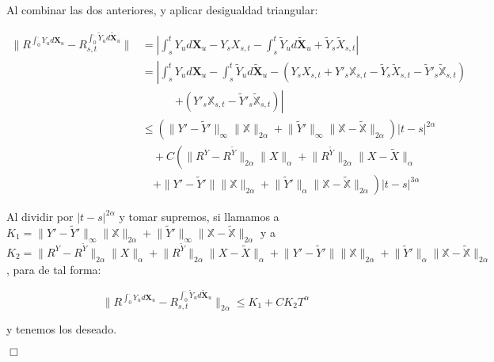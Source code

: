 Al combinar las dos anteriores, y aplicar desigualdad triangular:

\begin{align*}	
	\lVert R^{ \int_0^{\cdot} Y_u d \mathbf{X}_u} - R^{\int_0^{\cdot} \tilde{Y}_u d \tilde{ \mathbf{X} }_u }_{s,t}  \rVert &= \left\lvert \int_s^t Y_u d \mathbf{X}_u  - Y_s X_{s,t} - \int_s^t \tilde{Y}_u d \tilde{ \mathbf{X} }_u + \tilde{Y}_s \tilde{X}_{s,t} \right\rvert \\
	&= \left\lvert \int_s^t Y_u d \mathbf{X}_u  - \int_s^t \tilde{Y}_u d \tilde{ \mathbf{X} }_u - (Y_s X_{s,t}  + Y'_s \mathbb{X}_{s,t} - \tilde{Y}_s \tilde{X}_{s,t} - \tilde{Y}'_s \tilde{ \mathbb{X} }_{s,t} ) \right. \\
	& \qquad \quad \left. + (Y'_s \mathbb{X}_{s,t} - \tilde{Y}'_s \tilde{ \mathbb{X} }_{s,t})  \right\rvert \\ 
	&\leq \left( \lVert Y' - \tilde{Y}' \rVert_{\infty} \lVert \mathbb{X} \rVert_{2 \alpha} + \lVert \tilde{Y}' \rVert_{\infty} \lVert \mathbb{X} - \tilde{ \mathbb{X} } \rVert_{2 \alpha} \right) \lvert t - s \rvert^{2 \alpha} \\
	&\quad + C \left( \lVert R^Y - R^{ \tilde{Y} } \rVert_{2 \alpha} \lVert X \rVert_{\alpha} + \lVert R^{ \tilde{Y} } \rVert_{2 \alpha} \lVert X - \tilde{X} \rVert_{\alpha} \right. \\
	&\quad \left. + \lVert Y' - \tilde{Y}' \rVert \lVert \mathbb{X} \rVert_{2\alpha} + \lVert \tilde{Y}' \rVert_{\alpha} \lVert \mathbb{X} - \tilde{ \mathbb{X} } \rVert_{2\alpha} \right) \lvert t - s \rvert^{3 \alpha}
\end{align*}	

Al dividir por $\lvert t - s \rvert^{2 \alpha}$ y tomar supremos, si llamamos a $K_1 = \lVert Y' - \tilde{Y}' \rVert_{\infty} \lVert \mathbb{X} \rVert_{2 \alpha} + \lVert \tilde{Y}' \rVert_{\infty} \lVert \mathbb{X} - \tilde{ \mathbb{X} } \rVert_{2 \alpha}$ y a $K_2 = \lVert R^Y - R^{ \tilde{Y} } \rVert_{2 \alpha} \lVert X \rVert_{\alpha} + \lVert R^{ \tilde{Y} } \rVert_{2 \alpha} \lVert X - \tilde{X} \rVert_{\alpha} + \lVert Y' - \tilde{Y}' \rVert \lVert \mathbb{X} \rVert_{2\alpha} + \lVert \tilde{Y}' \rVert_{\alpha} \lVert \mathbb{X} - \tilde{ \mathbb{X} } \rVert_{2\alpha}$, para de tal forma:

\[
	\lVert R^{ \int_0^{\cdot} Y_u d \mathbf{X}_u} - R^{\int_0^{\cdot} \tilde{Y}_u d \tilde{ \mathbf{X} }_u }_{s,t}   \rVert_{ 2 \alpha } \leq K_1 + C K_2 T^{\alpha}
\]

y tenemos los deseado.


\begin{flushright}
	$\Box$
\end{flushright}

